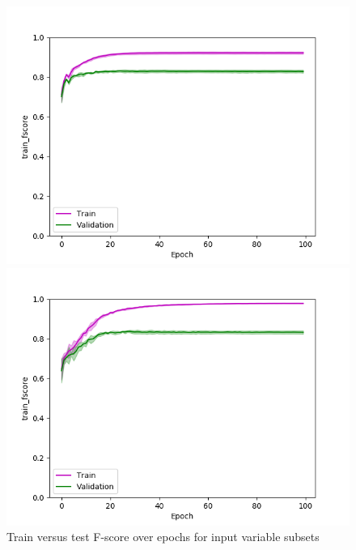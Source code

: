 \def\year{2017}\relax \documentclass[letterpaper]{article}
\begin{document}
\begin{figure}
\begin{minipage}{.24\textwidth}
  \centering
\includegraphics[width=\textwidth]{pics/d3_train_fscore_mean_train_test.png}
\caption{$D_3$}\label{fig:d3fscoretraintest}
\end{minipage}
\begin{minipage}{.01\textwidth}
\end{minipage}
\begin{minipage}{.24\textwidth}
  \centering
\includegraphics[width=\textwidth]{pics/d4_train_fscore_mean_train_test.png}
\caption{$D_4$}\label{fig:d4fscoretraintest}
\end{minipage}
\caption{Train versus test F-score over epochs for input variable subsets}\label{fig:traintestfscore}
\end{figure}
\end{document}
